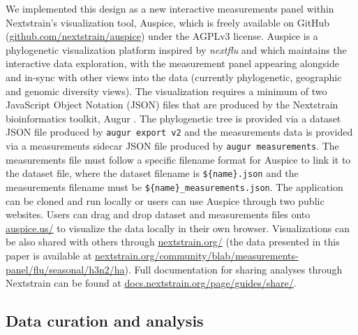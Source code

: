 \documentclass[utf8]{FrontiersinHarvard} %
\begin{document}
We implemented this design as a new interactive measurements panel within Nextstrain's visualization tool, Auspice, which is freely available on GitHub (\href{https://github.com/nextstrain/auspice}{github.com/nextstrain/auspice}) under the AGPLv3 license.
Auspice is a phylogenetic visualization platform inspired by \emph{nextflu} and which maintains the interactive data exploration, with the measurement panel appearing alongside and in-sync with other views into the data (currently phylogenetic, geographic and genomic diversity views).
The visualization requires a minimum of two JavaScript Object Notation (JSON) files that are produced by the Nextstrain bioinformatics toolkit, Augur \citep{Huddleston2021}.
The phylogenetic tree is provided via a dataset JSON file produced by \texttt{augur export v2} and the measurements data is provided via a measurements sidecar JSON file produced by \texttt{augur measurements}.
The measurements file must follow a specific filename format for Auspice to link it to the dataset file, where the dataset filename is \texttt{\$\{name\}.json} and the measurements filename must be \texttt{\$\{name\}\_measurements.json}.
The application can be cloned and run locally or users can use Auspice through two public websites.
Users can drag and drop dataset and measurements files onto \href{https://auspice.us/}{auspice.us/} to visualize the data locally in their own browser.
Visualizations can be also shared with others through \href{https://nextstrain.org/}{nextstrain.org/} (the data presented in this paper is available at \href{https://nextstrain.org/community/blab/measurements-panel/flu/seasonal/h3n2/ha}{nextstrain.org/community/blab/measurements-panel/flu/seasonal/h3n2/ha}).
Full documentation for sharing analyses through Nextstrain can be found at \href{https://docs.nextstrain.org/page/guides/share/}{docs.nextstrain.org/page/guides/share/}.

\subsection{Data curation and analysis}
\end{document}
